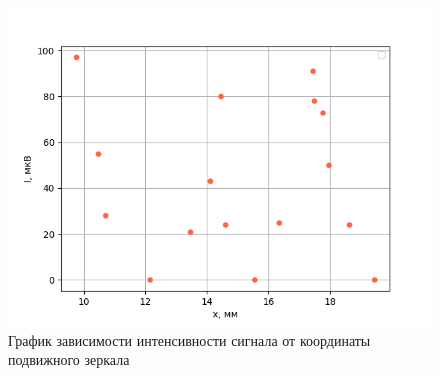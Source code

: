 \documentclass[a4paper,12pt]{article}
\begin{document}
\begin{figure}[h!]
    \centering
    \includegraphics[width=14cm]{Figure_1.png}
    \caption{График зависимости интенсивности сигнала от координаты подвижного зеркала}
    \label{fig:vac}
\end{figure}
\end{document}
